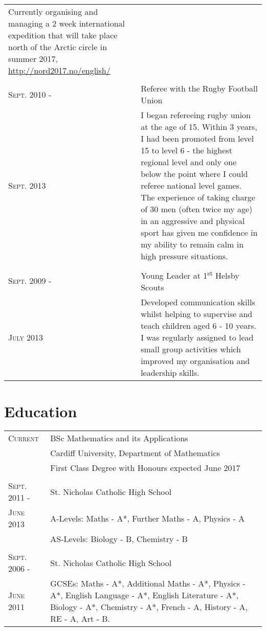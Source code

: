 \documentclass[a4paper]{article}
\begin{document}
\begin{tabularx}{\textwidth}{lX}
{Currently organising and managing a 2 week international expedition that will take place north of the Arctic circle in summer 2017, \url{http://nord2017.no/english/}}
\\
\\
\textsc{Sept. 2010 -} & Referee with the Rugby Football Union \\
\textsc{Sept. 2013} & \footnotesize{I began refereeing rugby union at the age of 15. Within 3 years, I had been promoted from level 15 to level 6 - the highest regional level and only one below the point where I could referee national level games.
The experience of taking charge of 30 men (often twice my age) in an aggressive and physical sport has given me confidence in my ability to remain calm in high pressure situations.}
\\
\\
\textsc{Sept. 2009 -} & Young Leader at 1\textsuperscript{st} Helsby Scouts\\
\textsc{July 2013} & \footnotesize{Developed communication skills whilst helping to supervise and teach children aged 6 - 10 years.
I was regularly assigned to lead small group activities which improved my organisation and leadership skills.}\\

\end{tabularx}
\section{Education}
\begin{tabularx}{\textwidth}{lX}

\textsc{Current} & \textsc BSc Mathematics and its Applications \\
&\normalsize Cardiff University, Department of Mathematics\\
& First Class Degree with Honours expected June 2017 \\
\\
\textsc{Sept. 2011 -} & St. Nicholas Catholic High School\\
\textsc{June 2013} & A-Levels: Maths - A*, Further Maths - A, Physics - A\\
& AS-Levels: Biology - B, Chemistry - B\\
\\
\textsc{Sept. 2006 -} & St. Nicholas Catholic High School\\
\textsc{June 2011} & GCSEs: Maths - A*, Additional Maths - A*, Physics - A*, English Language - A*, English Literature - A*, Biology - A*, Chemistry - A*, French - A, History - A, RE - A, Art - B.\\

\end{tabularx}
\end{document}
